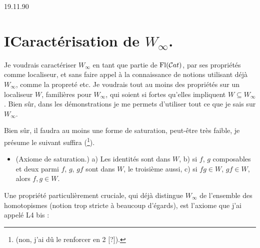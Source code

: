 \clearpage

\printedpage{--}


\clearpage



\hfill 19.11.90

\section*{I\quad Caractérisation de $W_\infty$.}

Je voudrais caractériser $W_\infty$ en tant que partie de $\mathrm{Fl}(\mathcal{C}at)$, par ses propriétés comme localiseur, et sans faire appel à la connaissance de notions utilisant déjà $W_\infty$, comme la propreté etc. Je voudrais tout au moins des propriétés sur un localiseur $W$, familières pour $W_\infty$, qui soient si fortes qu'elles impliquent $W \subseteq W_\infty$. Bien sûr, dans les démonstrations je me permets d'utiliser tout ce que je sais sur $W_\infty$.

Bien sûr, il faudra au moins une forme de saturation, peut-être très faible, je présume le suivant suffira (\footnote{(non, j'ai dû le renforcer en 2 [?]).}).

\begin{itemize}[leftmargin=*]
\item[\textbf{W(1)}] (Axiome de saturation.) a) Les identités sont dans $W$, b) si $f$, $g$ composables et deux parmi $f$, $g$, $gf$ sont dans $W$, le troisième aussi, c) si $fg \in W$, $gf \in W$, alors $f, g \in W$.
\end{itemize}

Une propriété particulièrement cruciale, qui déjà distingue $W_\infty$ de l'ensemble des homotopismes (notion trop stricte à beaucoup d'égards), est l'axiome que j'ai appelé L4 bis :

